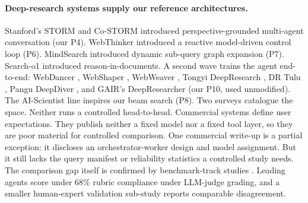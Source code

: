 \documentclass[11pt]{article}
\begin{document}
\paragraph{Deep-research systems supply our reference architectures.} Stanford's STORM
\citep{shao2024storm} and Co-STORM \citep{costorm2024} introduced perspective-grounded
multi-agent conversation (our P4). WebThinker \citep{webthinker2025} introduced a
reactive model-driven control loop (P6). MindSearch \citep{mindsearch2024} introduced
dynamic sub-query graph expansion (P7). Search-o1 \citep{searcho1_2025} introduced
reason-in-documents. A second wave trains the agent end-to-end: WebDancer
\citep{webdancer2025}, WebShaper \citep{webshaper2025}, WebWeaver \citep{webweaver2025},
Tongyi DeepResearch \citep{tongyi_dr2025}, DR Tulu \citep{shao2025drtulu}, Pangu
DeepDiver \citep{pangu_deepdiver2025}, and GAIR's DeepResearcher
\citep{deepresearcher2025} (our P10, used unmodified). The AI-Scientist line
\citep{aiscientistv1_2024,aiscientistv2_2025} inspires our beam search (P8). Two
surveys \citep{dragents_roadmap2025,dr_survey_autonomous2025} catalogue the space.
Neither runs a controlled head-to-head. Commercial systems
\citep{gemini_deepresearch2024,openai_deepresearch2025,perplexity_deepresearch2025,you_ari2025}
define user expectations. They publish neither a fixed model nor a fixed tool layer, so
they are poor material for controlled comparison. One commercial write-up
\citep{anthropic_multiagent_research2025} is a partial exception: it discloses an
orchestrator-worker design and model assignment. But it still lacks the query manifest
or reliability statistics a controlled study needs. The comparison gap itself is
confirmed by benchmark-track studies \citep{researchrubrics2025,du_deepresearchbench2025}.
Leading agents score under $68\%$ rubric compliance under LLM-judge grading, and a
smaller human-expert validation sub-study reports comparable disagreement.
\end{document}
